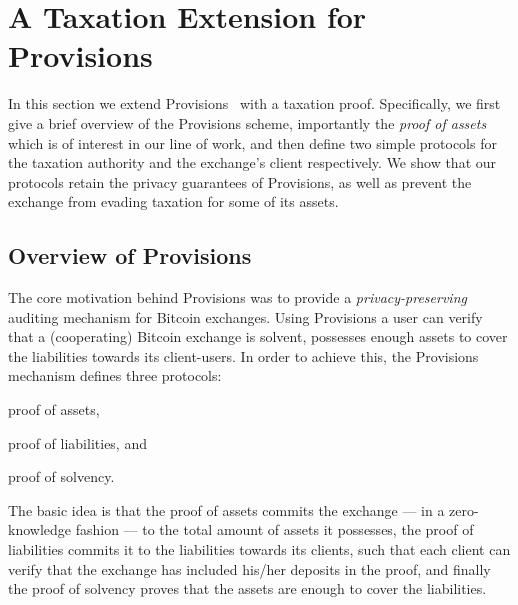 \section{A Taxation Extension for Provisions}\label{sec:provisions-extension}

In this section we extend Provisions~\cite{CCS:DBBCB15} with a taxation proof.
Specifically, we first give a brief overview of the Provisions scheme,
importantly the \emph{proof of assets} which is of interest in our line of
work, and then define two simple protocols for the taxation authority and the
exchange's client respectively. We show that our protocols retain the privacy
guarantees of Provisions, as well as prevent the exchange from evading taxation
for some of its assets.

\subsection{Overview of Provisions}\label{subsec:provisions-overview}

The core motivation behind Provisions was to provide a
\emph{privacy-preserving} auditing mechanism for Bitcoin exchanges. Using
Provisions a user can verify that a (cooperating) Bitcoin exchange is solvent,
\ie possesses enough assets to cover the liabilities towards its client-users.
In order to achieve this, the Provisions mechanism defines three protocols:
\begin{inparaenum}[i)]
    \item proof of assets,
    \item proof of liabilities, and
    \item proof of solvency.
\end{inparaenum}
The basic idea is that the proof of assets commits the exchange --- in a
zero-knowledge fashion --- to the total amount of assets it possesses, the
proof of liabilities commits it to the liabilities towards its clients, such
that each client can verify that the exchange has included his/her deposits in
the proof, and finally the proof of solvency proves that the assets are enough
to cover the liabilities.

